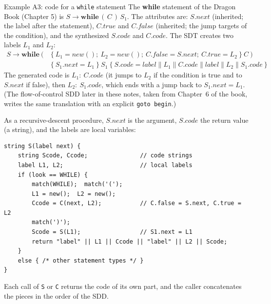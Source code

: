 \documentclass[11pt,a4paper]{article}
\newcommand{\cc}{\mathbin{\|}}
\newcommand{\at}[2]{\ensuremath{#1.\mathit{#2}}}
\newcommand{\tok}[1]{\ensuremath{\mathtt{#1}}}
\begin{document}
\begin{examplebox}{Example A3: code for a \texttt{while} statement}
The \textbf{while} statement of the Dragon Book (Chapter 5) is $S\to\mathbf{while}\,(\,C\,)\,S_1$. The attributes are: $S.next$ (inherited; the label after the statement), $C.true$ and $C.false$ (inherited; the jump targets of the condition), and the synthesized $S.code$ and $C.code$. The SDT creates two labels $L_1$ and $L_2$:
\begin{align*}
S \to \mathbf{while}\ \tok{(}\ &\{\ L_1=\mathit{new}();\ L_2=\mathit{new}();\ \at{C}{false}=\at{S}{next};\ \at{C}{true}=L_2\ \}\ C\ \tok{)}\\
&\{\ \at{S_1}{next}=L_1\ \}\ S_1\ \{\ \at{S}{code}=\mathit{label}\cc L_1\cc\at{C}{code}\cc\mathit{label}\cc L_2\cc\at{S_1}{code}\ \}
\end{align*}
The generated code is $L_1\!:\ C.code$ (it jumps to $L_2$ if the condition is true and to $S.next$ if false), then $L_2\!:\ S_1.code$, which ends with a jump back to $S_1.next=L_1$. (The flow-of-control SDD later in these notes, taken from Chapter~6 of the book, writes the same translation with an explicit \texttt{goto begin}.)

As a recursive-descent procedure, $S.next$ is the argument, $S.code$ the return value (a string), and the labels are local variables:
\begin{lstlisting}
string S(label next) {
    string Scode, Ccode;               // code strings
    label L1, L2;                      // local labels
    if (look == WHILE) {
        match(WHILE);  match('(');
        L1 = new();  L2 = new();
        Ccode = C(next, L2);           // C.false = S.next, C.true = L2
        match(')');
        Scode = S(L1);                 // S1.next = L1
        return "label" || L1 || Ccode || "label" || L2 || Scode;
    }
    else { /* other statement types */ }
}
\end{lstlisting}
Each call of \texttt{S} or \texttt{C} returns the code of its own part, and the caller concatenates the pieces in the order of the SDD.
\end{examplebox}
\end{document}
